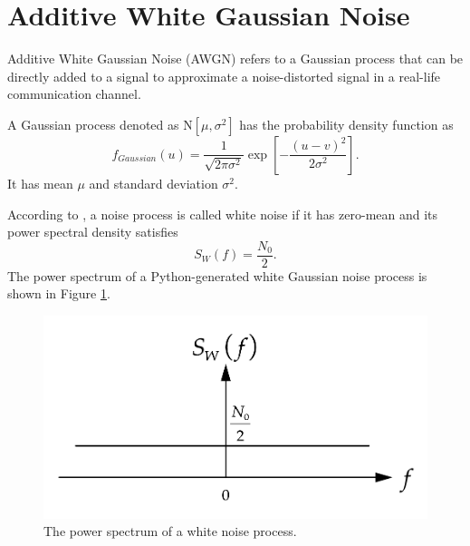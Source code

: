 \documentclass[../ECE459FinalProjectReport.tex]{subfiles}
\begin{document}
\section{Additive White Gaussian Noise}
Additive White Gaussian Noise (AWGN) refers to a Gaussian process that can be directly added to a signal to approximate a noise-distorted signal in a real-life communication channel.

A Gaussian process denoted as $\mathrm{N}\left[ \mu, \sigma^2 \right]$ has the probability density function as
\begin{equation}
    f_{Gaussian}\left(u\right) = \frac{1}{\sqrt{2\pi\sigma^2}}\exp\left[ -\frac{\left(u-v\right)^2}{2\sigma^2} \right].
\end{equation}
It has mean $\mu$ and standard deviation $\sigma^2$.

According to \cite[Sec. 8.10]{haykinIntroductionAnalogDigital2007}, a noise process is called white noise if it has zero-mean and its power spectral density satisfies
\begin{equation}
    S_W\left(f\right) = \frac{N_0}{2}.
\end{equation}
The power spectrum of a Python-generated white Gaussian noise process is shown in Figure \ref{fig:white-noise-spectrum}.
\begin{figure}[tb]
    \centering
    \includegraphics[scale=0.35]{plots/white-noise-power-spectrum.pdf}
    \caption{The power spectrum of a white noise process.}
    \label{fig:white-noise-spectrum}
\end{figure}
\end{document}
